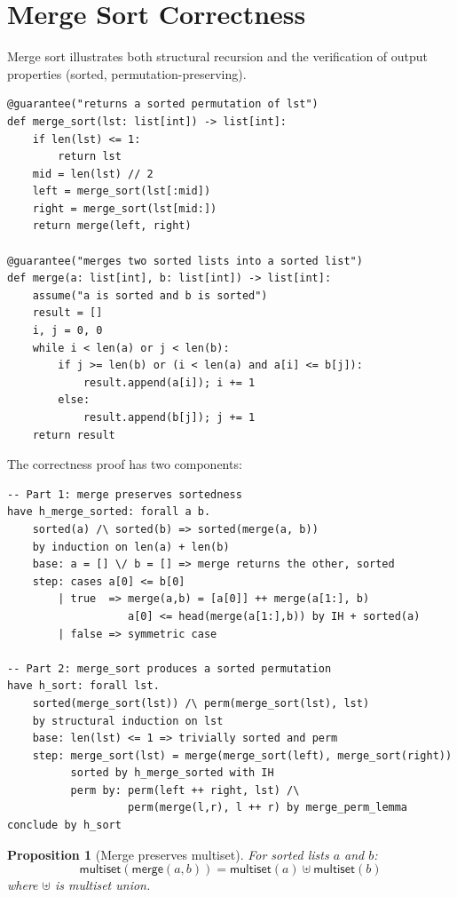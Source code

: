 \documentclass[11pt,a4paper]{report}
\theoremstyle{definition}
\theoremstyle{plain}
\newtheorem{proposition}[definition]{Proposition}
\begin{document}
\section{Merge Sort Correctness}

Merge sort illustrates both structural recursion and the verification of
output properties (sorted, permutation-preserving).

\begin{lstlisting}[style=synhopy]
@guarantee("returns a sorted permutation of lst")
def merge_sort(lst: list[int]) -> list[int]:
    if len(lst) <= 1:
        return lst
    mid = len(lst) // 2
    left = merge_sort(lst[:mid])
    right = merge_sort(lst[mid:])
    return merge(left, right)

@guarantee("merges two sorted lists into a sorted list")
def merge(a: list[int], b: list[int]) -> list[int]:
    assume("a is sorted and b is sorted")
    result = []
    i, j = 0, 0
    while i < len(a) or j < len(b):
        if j >= len(b) or (i < len(a) and a[i] <= b[j]):
            result.append(a[i]); i += 1
        else:
            result.append(b[j]); j += 1
    return result
\end{lstlisting}

The correctness proof has two components:

\begin{lstlisting}[style=proof]
-- Part 1: merge preserves sortedness
have h_merge_sorted: forall a b.
    sorted(a) /\ sorted(b) => sorted(merge(a, b))
    by induction on len(a) + len(b)
    base: a = [] \/ b = [] => merge returns the other, sorted
    step: cases a[0] <= b[0]
        | true  => merge(a,b) = [a[0]] ++ merge(a[1:], b)
                   a[0] <= head(merge(a[1:],b)) by IH + sorted(a)
        | false => symmetric case

-- Part 2: merge_sort produces a sorted permutation
have h_sort: forall lst.
    sorted(merge_sort(lst)) /\ perm(merge_sort(lst), lst)
    by structural induction on lst
    base: len(lst) <= 1 => trivially sorted and perm
    step: merge_sort(lst) = merge(merge_sort(left), merge_sort(right))
          sorted by h_merge_sorted with IH
          perm by: perm(left ++ right, lst) /\
                   perm(merge(l,r), l ++ r) by merge_perm_lemma
conclude by h_sort
\end{lstlisting}

\begin{proposition}[Merge preserves multiset]
\label{prop:merge-multiset}
For sorted lists $a$ and $b$:
\[
  \mathsf{multiset}(\mathsf{merge}(a, b)) = \mathsf{multiset}(a) \uplus \mathsf{multiset}(b)
\]
where $\uplus$ is multiset union.
\end{proposition}
\end{document}
